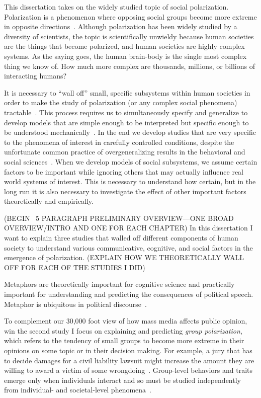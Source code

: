 \documentclass[12pt,letterpaper]{article}
\begin{document}
This dissertation takes on the widely studied topic of social polarization. 
Polarization is a phenomenon where opposing social groups become more extreme
in opposite directions~\cite{Bramson2016,Bramson2017,Jung2019,Klein2020,StewartMcCBryson2020}. 
Although polarization has been widely studied by a diversity of scientists,
the topic is scientifically unwieldy because human societies are the things
that become polarized, and human societies are highly complex systems. As the
saying goes, the human brain-body is the single most complex thing we know of.
How much more complex are thousands, millions, or billions of interacting 
humans?

It is necessary to ``wall off'' small, specific subsystems within human
societies in order to make the study of polarization (or any complex social
phenomena) tractable~\cite{Cartwright1999}.
This process requires us to simultaneously specify and generalize to 
develop models that
are simple enough to be interpreted but specific enough to be understood
mechanically~\cite{Craver2006,Wimsatt2007,Smaldino2017,Turner2021}. In the end
we develop studies that are very specific to the phenomena of interest
in carefully controlled conditions, despite the unfortunate common practice of
overgeneralizing results in the behavioral and social sciences~\cite{Yarkoni2021}.
When we develop models of social subsystems, we assume certain factors to be
important while ignoring others that may actually influence real world systems
of interest. This is necessary to understand how certain, but in the long run
it is also necessary to investigate the effect of other important factors
theoretically and empirically.

(BEGIN ~5 PARAGRAPH PRELIMINARY OVERVIEW---ONE BROAD OVERVIEW/INTRO AND 
ONE FOR EACH CHAPTER)
In this dissertation I want to explain three studies that walled off different
components of human society to understand various communicative, cognitive, and
social factors in the emergence of polarization. (EXPLAIN HOW WE THEORETICALLY
WALL OFF FOR EACH OF THE STUDIES I DID)

Metaphors are theoretically important for cognitive science and practically
important for understanding and predicting the consequences of political
speech. Metaphor is ubiquitous in political discourse~\cite{Burnes2011,Charteris-Black2009,Charteris-Black2005,Charteris-Black2004,Lakoff1996,Lakoff2008}.

To complement our 30,000 foot view of how mass media affects public opinion,
win the second study I focus on explaining and predicting \emph{group polarization},
which refers to the tendency of small groups to become more extreme in their
opinions on some topic or in their decision making. For example, a jury that
has to decide damages for a civil liability lawsuit might increase the amount
they are willing to award a victim of some wrongdoing~\cite{Schkade2000}.
Group-level behaviors and traits emerge only when individuals interact
and so must be studied independently from individual- and societal-level
phenomena~\cite{Goldstone2008,Smaldino2014}.
\end{document}
